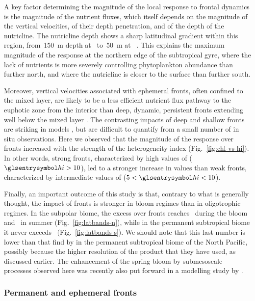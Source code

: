 A key factor determining the magnitude of the local  response to frontal dynamics is the magnitude of the nutrient fluxes, which itself depends on the magnitude of the vertical velocities, of their depth penetration, and of the depth of the nutricline.
The nutricline depth shows a sharp latitudinal gradient within this region, from~\qty{150}{\m} depth at~ to~\qty{50}{\m} at~ \parencite{romera-castillo_2016}.
This explains the maximum magnitude of the  response at the northern edge of the subtropical gyre, where the lack of nutrients is more severely controlling phytoplankton abundance than further north, and where the nutricline is closer to the surface than further south.

Moreover, vertical velocities associated with ephemeral fronts, often confined to the mixed layer, are likely to be a less efficient nutrient flux pathway to the euphotic zone from the interior than deep, dynamic, persistent fronts extending well below the mixed layer \parencite{levy_2018}.
The contrasting impacts of deep and shallow fronts are striking in models \parencite{levy_2012}, but are difficult to quantify from a small number of in situ observations.
Here we observed that the magnitude of the  response over fronts increased with the strength of the heterogeneity index  (Fig.~\ref{fig:chl-vs-hi}).
In other words, strong fronts, characterized by high values of  (\(\am{hi} > 10\)), led to a stronger increase in  values than weak fronts, characterized by intermediate values of  (\(5 < \am{hi} < 10\)).

Finally, an important outcome of this study is that, contrary to what is generally thought, the impact of fronts is stronger in bloom regimes than in oligotrophic regimes.
In the subpolar biome, the   excess over fronts reaches~ during the bloom and~ in summer (Fig.~\ref{fig:latbands-n}), while in the permanent subtropical biome it never exceeds~ (Fig.~\ref{fig:latbands-s}).
We should note that this last number is lower than that find by \textcite{liu_2016} in the permanent subtropical biome of the North Pacific, possibly because the higher resolution of the product that they have used, as discussed earlier.
The enhancement of the spring bloom by submesoscale processes observed here was recently also put forward in a modelling study by \textcite{simoes-sousa_2022}.

\subsubsection{Permanent and ephemeral fronts}

